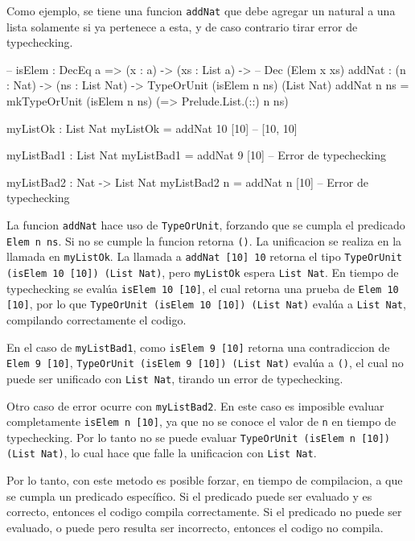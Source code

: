 Como ejemplo, se tiene una funcion \texttt{addNat} que debe agregar un natural a una lista solamente si ya pertenece a esta, y de caso contrario tirar error de typechecking.

\begin{code}
-- isElem : DecEq a => (x : a) -> (xs : List a) -> 
--  Dec (Elem x xs)
addNat : (n : Nat) -> (ns : List Nat) -> 
  TypeOrUnit (isElem n ns) (List Nat)
addNat n ns = mkTypeOrUnit (isElem n ns) 
  (\isElem => Prelude.List.(::) n ns)

myListOk : List Nat
myListOk = addNat 10 [10] -- [10, 10]

myListBad1 : List Nat
myListBad1 = addNat 9 [10] -- Error de typechecking

myListBad2 : Nat -> List Nat
myListBad2 n = addNat n [10] -- Error de typechecking
\end{code}

La funcion \texttt{addNat} hace uso de \texttt{TypeOrUnit}, forzando que se cumpla el predicado \texttt{Elem n ns}. Si no se cumple la funcion retorna \texttt{()}. La unificacion se realiza en la llamada en \texttt{myListOk}. La llamada a \texttt{addNat [10] 10} retorna el tipo \texttt{TypeOrUnit (isElem 10 [10]) (List Nat)}, pero \texttt{myListOk} espera \texttt{List Nat}. En tiempo de typechecking se evalúa \texttt{isElem 10 [10]}, el cual retorna una prueba de \texttt{Elem 10 [10]}, por lo que \texttt{TypeOrUnit (isElem 10 [10]) (List Nat)} evalúa a \texttt{List Nat}, compilando correctamente el codigo.

En el caso de \texttt{myListBad1}, como \texttt{isElem 9 [10]} retorna una contradiccion de \texttt{Elem 9 [10]}, \texttt{TypeOrUnit (isElem 9 [10]) (List Nat)} evalúa a \texttt{()}, el cual no puede ser unificado con \texttt{List Nat}, tirando un error de typechecking.

Otro caso de error ocurre con \texttt{myListBad2}. En este caso es imposible evaluar completamente \texttt{isElem n [10]}, ya que no se conoce el valor de \texttt{n} en tiempo de typechecking. Por lo tanto no se puede evaluar \texttt{TypeOrUnit (isElem n [10]) (List Nat)}, lo cual hace que falle la unificacion con \texttt{List Nat}.

Por lo tanto, con este metodo es posible forzar, en tiempo de compilacion, a que se cumpla un predicado específico. Si el predicado puede ser evaluado y es correcto, entonces el codigo compila correctamente. Si el predicado no puede ser evaluado, o puede pero resulta ser incorrecto, entonces el codigo no compila.

